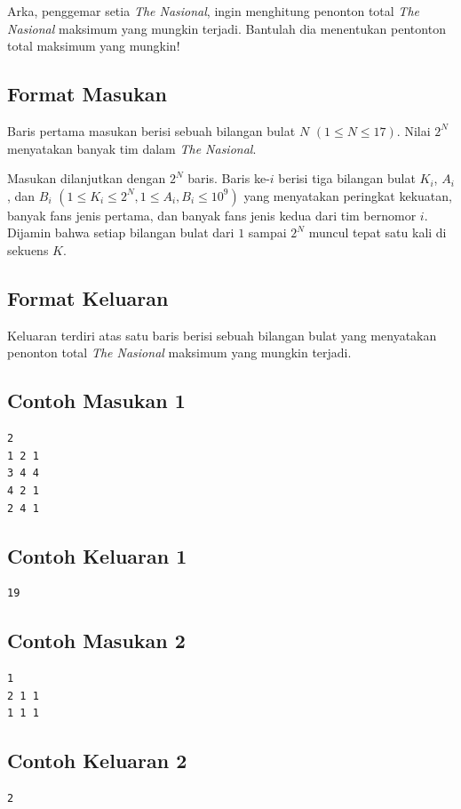 \documentclass{article}
\begin{document}
Arka, penggemar setia \textit{The Nasional}, ingin menghitung penonton total \textit{The Nasional} maksimum yang mungkin terjadi. Bantulah dia menentukan pentonton total maksimum yang mungkin!

\subsection*{Format Masukan}
Baris pertama masukan berisi sebuah bilangan bulat $N$ $(1 \leq N \leq 17)$. Nilai $2^N$ menyatakan banyak tim dalam \textit{The Nasional}.

Masukan dilanjutkan dengan $2^N$ baris. Baris ke-$i$ berisi tiga bilangan bulat $K_i$, $A_i$, dan $B_i$ $(1 \leq K_i \leq 2^N, 1 \leq A_i, B_i \leq 10^9)$ yang menyatakan peringkat kekuatan, banyak fans jenis pertama, dan banyak fans jenis kedua dari tim bernomor $i$. Dijamin bahwa setiap bilangan bulat dari $1$ sampai $2^N$ muncul tepat satu kali di sekuens $K$.

\subsection*{Format Keluaran}
Keluaran terdiri atas satu baris berisi sebuah bilangan bulat yang menyatakan penonton total \textit{The Nasional} maksimum yang mungkin terjadi.

\pagebreak
\begin{multicols}{2}
\subsection*{Contoh Masukan 1}
\begin{lstlisting}
2
1 2 1
3 4 4
4 2 1
2 4 1
\end{lstlisting}
\null
\columnbreak

\subsection*{Contoh Keluaran 1}
\begin{lstlisting}
19
\end{lstlisting}
\vfill
\null
\end{multicols}

\begin{multicols}{2}
\subsection*{Contoh Masukan 2}
\begin{lstlisting}
1
2 1 1
1 1 1
\end{lstlisting}
\null
\columnbreak

\subsection*{Contoh Keluaran 2}
\begin{lstlisting}
2
\end{lstlisting}
\vfill
\null
\end{multicols}
\end{document}
